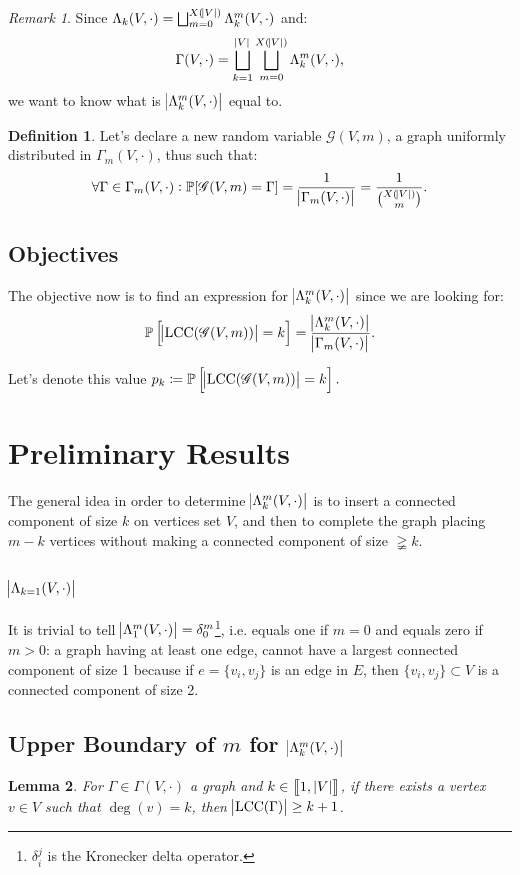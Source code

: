 \documentclass{article}
\newtheorem{lemma}{Lemma}[section]
\theoremstyle{definition}
\newtheorem{definition}[lemma]{Definition}
\theoremstyle{remark}
\newtheorem*{remark}{Remark}
\DeclareMathOperator{\LCC}{LCC}
\renewcommand{\P}{\mathbb P}
\newcommand{\intint}[2]{\left\llbracket#1, \, #2\right\rrbracket}
\begin{document}
		\begin{remark} Since $\Lambda_k(V, \cdot) = \bigsqcup_{m=0}^{X(\abs V)}\Lambda_k^m(V, \cdot)$ and:
		\[\Gamma(V, \cdot) = \bigsqcup_{k=1}^{\abs V}\bigsqcup_{m=0}^{X(\abs V)}\Lambda_k^m(V, \cdot),\]
		we want to know what is $\abs {\Lambda_k^m(V, \cdot)}$ equal to.
		\end{remark}

		\begin{definition} Let's declare a new random variable $\mathscr G(V, m)$, a graph uniformly distributed in $\Gamma_m(V, \cdot)$, thus such that:
		\[\forall \Gamma \in \Gamma_m(V, \cdot) : \P[\mathscr G(V, m) = \Gamma] = \frac 1{\abs {\Gamma_m(V, \cdot)}} = \frac 1{\binom {X(\abs V)}m}.\]
		\end{definition}

	\subsection{Objectives}
		The objective now is to find an expression for $\abs {\Lambda_k^m(V, \cdot)}$ since we are looking for:
		\[\P\left[\abs {\LCC(\mathscr G(V, m))} = k\right] = \frac {\abs {\Lambda_k^m(V, \cdot)}}{\abs {\Gamma_m(V, \cdot)}}.\]

		Let's denote this value $p_k \coloneqq \P\left[\abs {\LCC(\mathscr G(V, m))} = k\right].$

\section{Preliminary Results}\label{sec:results}
	The general idea in order to determine $\abs {\Lambda_k^m(V, \cdot)}$ is to insert a connected component of size $k$ on vertices set $V$, and then to complete the graph
	placing $m-k$ vertices without making a connected component of size $\gneqq k$.

	\subsection{$\abs {\Lambda_{k=1}(V, \cdot)}$}
		It is trivial to tell $\abs {\Lambda_1^m(V, \cdot)} = \delta_0^m$\footnote{$\delta_i^j$ is the Kronecker delta operator.}, i.e. equals one if $m=0$ and equals zero
		if $m>0$: a graph having at least one edge, cannot have a largest connected component of size 1 because if $e = \{v_i, v_j\}$ is an edge in $E$, then
		$\{v_i, v_j\} \subset V$ is a connected component of size 2.

	\subsection{Upper Boundary of $m$ for $\abs {\Lambda_k^m(V, \cdot)}$}
		\begin{lemma} For $\Gamma \in \Gamma(V, \cdot)$ a graph and $k \in \intint 1{\abs V}$, if there exists a vertex $v \in V$ such that $\deg(v) = k$,
		then $\abs {\LCC(\Gamma)} \geq k+1$.
		\end{lemma}
\end{document}
